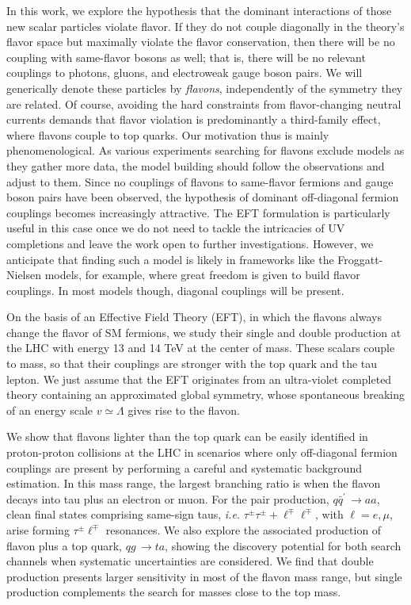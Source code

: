 \documentclass[prd,amsfonts,onecolumn,superscriptaddress,aps,nofootinbib,11pt]{revtex4-1}
\begin{document}
In this work, we explore the hypothesis that the dominant interactions of those new scalar particles violate flavor. If they do not couple diagonally in the theory's flavor space but maximally violate the flavor conservation, then there will be no coupling with same-flavor bosons as well; that is, there will be no relevant couplings to photons, gluons, and electroweak gauge boson pairs. We will generically denote these particles by {\it flavons}, independently of the symmetry they are related. Of course, avoiding the hard constraints from flavor-changing neutral currents demands that flavor violation is predominantly a third-family effect, where flavons couple to top quarks. Our motivation thus is mainly phenomenological. As various experiments searching for flavons exclude models as they gather more data, the model building should follow the observations and adjust to them. Since no couplings of flavons to same-flavor fermions and gauge boson pairs have been observed, the hypothesis of dominant off-diagonal fermion couplings becomes increasingly attractive. The EFT formulation is particularly useful in this case once we do not need to tackle the intricacies of UV completions and leave the work open to further investigations. However, we anticipate that finding such a model is likely in frameworks like the Froggatt-Nielsen models, for example, where great freedom is given to build flavor couplings. In most models though, diagonal couplings will be present.

On the basis of an Effective Field Theory (EFT), in which the flavons always change the flavor of SM fermions, we study their single and double production at the LHC with energy 13 and 14 TeV at the center of mass. These scalars couple to mass, so that their couplings are stronger with the top quark and the tau lepton. We just assume that the EFT originates from an ultra-violet completed theory containing an approximated global symmetry, whose spontaneous breaking of an energy scale $v\simeq\Lambda$ gives rise to the flavon. 

We show that flavons lighter than the top quark can be easily identified in proton-proton collisions at the LHC in scenarios where only off-diagonal fermion couplings are present by performing a careful and systematic background estimation. In this mass range, the largest branching ratio is when the flavon decays into tau plus an electron or muon. For the pair production, $q\bar{q}^\prime\,\rightarrow aa$, clean final states comprising same-sign taus, \textit{i.e.} $\tau^{\pm}\tau^{\pm}+\ell^\mp\ell^\mp$, with $\ell=e,\mu$, arise forming $\tau^\pm\ell^\mp$ resonances. We also explore the associated production of flavon plus a top quark, $qg \,\rightarrow ta$, showing the discovery potential for both search channels when systematic uncertainties are considered. We find that double production presents larger sensitivity in most of the flavon mass range, but single production complements the search for masses close to the top mass. 
\end{document}
